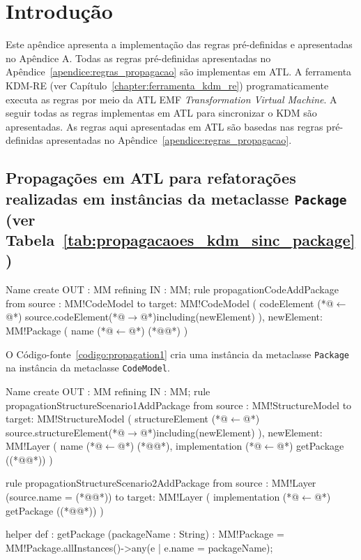 \section{Introdução}

Este apêndice apresenta a implementação das regras pré-definidas e apresentadas no Apêndice A. Todas as regras pré-definidas apresentadas no Apêndice~\ref{apendice:regras_propagacao} são implementas em ATL. A ferramenta KDM-RE (ver Capítulo~\ref{chapter:ferramenta_kdm_re}) programaticamente executa as regras por meio da ATL EMF \textit{Transformation Virtual Machine}. A seguir todas as regras implementas em ATL para sincronizar o KDM são apresentadas. As regras aqui apresentadas em ATL são basedas nas regras pré-definidas apresentadas no Apêndice~\ref{apendice:regras_propagacao}. 

\subsection{Propagações em ATL para refatorações realizadas em instâncias da metaclasse \texttt{Package} (ver Tabela~\ref{tab:propagacaoes_kdm_sinc_package})}

\begin{codigo}[caption={[ATL para realizar a operação atômica \texttt{change} \texttt{ClassUnit}.] ATL para realizar a operação atômica \texttt{change} \texttt{ClassUnit}.},escapeinside={(*@}{@*)}, basicstyle=\footnotesize, label={codigo:propagation1}, language=ATL]{Name}
create OUT : MM refining IN : MM;
rule propagationCodeAddPackage{
	from
		source : MM!CodeModel
	to 
		target: MM!CodeModel (
			codeElement (*@$\leftarrow$@*) source.codeElement(*@$\rightarrow$@*)including(newElement)
		),
		newElement: MM!Package (
			name (*@$\leftarrow$@*) (*@@*)
		)
}
\end{codigo}

O Código-fonte~\ref{codigo:propagation1} cria uma instância da metaclasse \texttt{Package} na instância da metaclasse \texttt{CodeModel}. 


\begin{codigo}[caption={[ATL para realizar a operação atômica \texttt{change} \texttt{ClassUnit}.] ATL para realizar a operação atômica \texttt{change} \texttt{ClassUnit}.},escapeinside={(*@}{@*)}, basicstyle=\footnotesize, label={codigo:propagation2}, language=ATL]{Name}
create OUT : MM refining IN : MM;
rule propagationStructureScenario1AddPackage{
	from
		source : MM!StructureModel
	to 
		target: MM!StructureModel (
			structureElement (*@$\leftarrow$@*) source.structureElement(*@$\rightarrow$@*)including(newElement)
		),
		newElement: MM!Layer (
			name (*@$\leftarrow$@*) (*@@*),
			implementation (*@$\leftarrow$@*) getPackage ((*@@*))
		)
}

rule propagationStructureScenario2AddPackage{
	from
		source : MM!Layer (source.name = (*@@*))
	to 
		target: MM!Layer (
			implementation (*@$\leftarrow$@*) getPackage ((*@@*))
		)
}

helper def : getPackage (packageName : String) : MM!Package = MM!Package.allInstances()->any(e | e.name = packageName);
\end{codigo}

